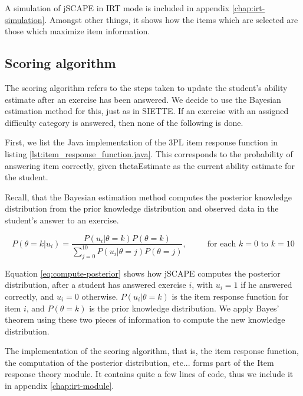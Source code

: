 A simulation of jSCAPE in IRT mode is included in appendix \ref{chap:irt-simulation}. Amongst other things, it shows how the items which are selected are those which maximize item information.

\subsection{Scoring algorithm}
The scoring algorithm refers to the steps taken to update the student's ability estimate after an exercise has been answered. We decide to use the Bayesian estimation method for this, just as in SIETTE. If an exercise with an assigned difficulty category is answered, then none of the following is done.
\newpage



First, we list the Java implementation of the 3PL item response function in listing \ref{lst:item_response_function.java}. This corresponds to the probability of answering \textsf{item} correctly, given \textsf{thetaEstimate} as the current ability estimate for the student. \newline

Recall, that the Bayesian estimation method computes the posterior knowledge distribution from the prior knowledge distribution and observed data in the student's answer to an exercise.

\begin{equation}
\label{eq:compute-posterior}
P(\theta=k|u_i) = \frac{P(u_i|\theta=k)P(\theta=k)}{\sum_{j=0}^{10}P(u_i|\theta=j)P(\theta=j)}, \;\;\;\;\;\;\;\;\; \text{for each } k=0 \text{ to } k=10 
\end{equation}

Equation \eqref{eq:compute-posterior} shows how jSCAPE computes the posterior distribution, after a student has answered exercise $i$, with $u_i=1$ if he answered correctly, and $u_i=0$ otherwise. $P(u_i|\theta=k)$ is the item response function for item $i$, and $P(\theta=k)$ is the prior knowledge distribution. We apply Bayes' theorem using these two pieces of information to compute the new knowledge distribution. \newline

The implementation of the scoring algorithm, that is, the item response function, the computation of the posterior distribution, etc... forms part of the Item response theory module. It contains quite a few lines of code, thus we include it in appendix \ref{chap:irt-module}.\newline

